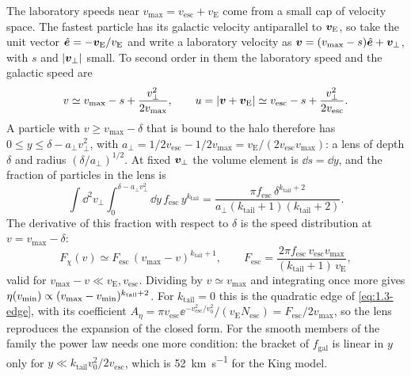 The laboratory speeds near $v_{\mathrm{max}} = v_{\mathrm{esc}} + v_{\mathrm{E}}$ come from a small cap of velocity space. The fastest particle has its galactic velocity antiparallel to $\bm{v}_{\mathrm{E}}$, so take the unit vector $\hat{\bm{e}} = -\bm{v}_{\mathrm{E}}/v_{\mathrm{E}}$ and write a laboratory velocity as $\bm{v} = (v_{\mathrm{max}} - s)\hat{\bm{e}} + \bm{v}_\perp$, with $s$ and $|\bm{v}_\perp|$ small. To second order in them the laboratory speed and the galactic speed are
\begin{equation*}
  v \simeq v_{\mathrm{max}} - s + \frac{v_\perp^2}{2v_{\mathrm{max}}} , \qquad
  u = |\bm{v} + \bm{v}_{\mathrm{E}}| \simeq v_{\mathrm{esc}} - s + \frac{v_\perp^2}{2v_{\mathrm{esc}}} .
\end{equation*}
A particle with $v \ge v_{\mathrm{max}} - \delta$ that is bound to the halo therefore has $0 \le y \le \delta - a_\perp v_\perp^2$, with $a_\perp = 1/2v_{\mathrm{esc}} - 1/2v_{\mathrm{max}} = v_{\mathrm{E}}/(2v_{\mathrm{esc}}v_{\mathrm{max}})$: a lens of depth $\delta$ and radius $(\delta/a_\perp)^{1/2}$. At fixed $\bm{v}_\perp$ the volume element is $\dd s = \dd y$, and the fraction of particles in the lens is
\begin{equation*}
  \int\!\dd^2v_\perp\int_0^{\delta - a_\perp v_\perp^2}\!\dd y\, f_{\mathrm{esc}}\,y^{k_{\mathrm{tail}}}
  = \frac{\pi f_{\mathrm{esc}}\,\delta^{k_{\mathrm{tail}}+2}}{a_\perp(k_{\mathrm{tail}}+1)(k_{\mathrm{tail}}+2)} .
\end{equation*}
The derivative of this fraction with respect to $\delta$ is the speed distribution at $v = v_{\mathrm{max}} - \delta$:
\begin{equation}
  F_\chi(v) \simeq F_{\mathrm{esc}}\,(v_{\mathrm{max}} - v)^{k_{\mathrm{tail}}+1} , \qquad
  F_{\mathrm{esc}} = \frac{2\pi f_{\mathrm{esc}}\,v_{\mathrm{esc}}v_{\mathrm{max}}}{(k_{\mathrm{tail}}+1)\,v_{\mathrm{E}}} ,
  \label{eq:21.3-tail}
\end{equation}
valid for $v_{\mathrm{max}} - v \ll v_{\mathrm{E}}, v_{\mathrm{esc}}$. Dividing by $v \simeq v_{\mathrm{max}}$ and integrating once more gives $\eta(v_{\mathrm{min}}) \propto (v_{\mathrm{max}} - v_{\mathrm{min}})^{k_{\mathrm{tail}}+2}$. For $k_{\mathrm{tail}} = 0$ this is the quadratic edge of \cref{eq:1.3-edge}, with its coefficient $A_\eta = \pi v_{\mathrm{esc}}\ee^{-v_{\mathrm{esc}}^2/v_0^2}/(v_{\mathrm{E}}N_{\mathrm{esc}}) = F_{\mathrm{esc}}/2v_{\mathrm{max}}$, so the lens reproduces the expansion of the closed form. For the smooth members of the family the power law needs one more condition: the bracket of $f_{\mathrm{gal}}$ is linear in $y$ only for $y \ll k_{\mathrm{tail}}v_0^2/2v_{\mathrm{esc}}$, which is \SI{52}{km.s^{-1}} for the King model.

